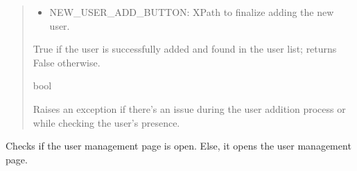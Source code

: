 \documentclass[letterpaper,10pt,english]{sphinxmanual}
\begin{document}
\begin{fulllineitems}
\begin{quote}
\begin{description}
\begin{itemize}
\begin{itemize}
\item {} 
\sphinxAtStartPar
NEW\_USER\_ADD\_BUTTON: XPath to finalize adding the new user.

\end{itemize}


\end{itemize}

\sphinxAtStartPar
True if the user is successfully added and found in the user list; returns False otherwise.

\sphinxAtStartPar
bool

\sphinxAtStartPar
{} \textendash{} Raises an exception if there’s an issue during the user addition process
or while checking the user’s presence.

\end{description}\end{quote}

\end{fulllineitems}


\begin{fulllineitems}
\label{\detokenize{utils:utils.user_management.check_presence_user_management_page}}
\pysigstartsignatures
{}
\pysigstopsignatures
\sphinxAtStartPar
Checks if the user management page is open. Else, it opens the user management page.

\end{fulllineitems}

\end{document}
